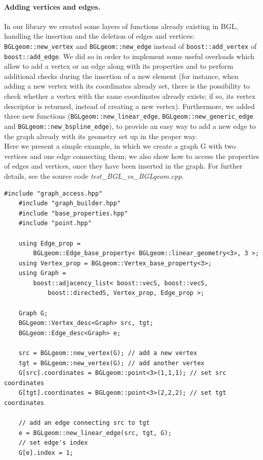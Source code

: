 \documentclass[10pt]{article} %
\begin{document}
	\paragraph{Adding vertices and edges.} In our library we created some layers of functions already existing in BGL, handling the insertion and the deletion of edges and vertices: \texttt{BGLgeom::new\_vertex} and \texttt{BGLgeom::new\_edge} instead of \texttt{boost::add\_vertex} of \texttt{boost::add\_edge}. We did so in order to implement some useful overloads which allow to add a vertex or an edge along with its properties and to perform additional checks during the insertion of a new element (for instance, when adding a new vertex with its coordinates already set, there is the possibility to check whether a vertex with the same coordinates already exists; if so, its vertex descriptor is returned, instead of creating a new vertex). Furthermore, we added three new functions (\texttt{BGLgeom::new\_linear\_edge}, \texttt{BGLgeom::new\_generic\_edge} and \texttt{BGLgeom::new\_bspline\_edge}), to provide an easy way to add a new edge to the graph already with its geometry set up in the proper way.\\
	Here we present a simple example, in which we create a graph G with two vertices and one edge connecting them; we also show how to access the properties of edges and vertices, once they have been inserted in the graph. For further details, see the source code \textit{test\_BGL\_vs\_BGLgeom.cpp}.	
	\begin{lstlisting}[frame=single]
	#include "graph_access.hpp"
	#include "graph_builder.hpp"
	#include "base_properties.hpp"		
	#include "point.hpp"
	
	using Edge_prop = 
		BGLgeom::Edge_base_property< BGLgeom::linear_geometry<3>, 3 >;
	using Vertex_prop = BGLgeom::Vertex_base_property<3>;
	using Graph = 
		boost::adjacency_list< boost::vecS, boost::vecS, 
			boost::directedS, Vertex_prop, Edge_prop >;
	
	Graph G;
	BGLgeom::Vertex_desc<Graph> src, tgt;
	BGLgeom::Edge_desc<Graph> e;
	
	src = BGLgeom::new_vertex(G); // add a new vertex 
	tgt = BGLgeom::new_vertex(G); // add another vertex
	G[src].coordinates = BGLgeom::point<3>(1,1,1); // set src coordinates
	G[tgt].coordinates = BGLgeom::point<3>(2,2,2); // set tgt coordinates
	
	// add an edge connecting src to tgt
	e = BGLgeom::new_linear_edge(src, tgt, G);
	// set edge's index	
	G[e].index = 1;
	\end{lstlisting}
	
\end{document}
